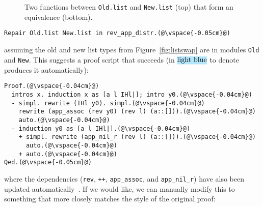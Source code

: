 \iffalse
\begin{figure*}
\begin{minipage}{0.46\textwidth}
   
\end{minipage}
\hfill
\begin{minipage}{0.46\textwidth}
   
\end{minipage}
\vspace{-0.4cm}
\caption{The updated \lstinline{list} (right) is the old \lstinline{list} (left) with its two constructors swapped (\codediff{orange}).}
\label{fig:listswap}
\end{figure*}
\fi

\begin{figure*}
\vspace{-0.3cm}
\caption{Two functions between \lstinline{Old.list} and \lstinline{New.list} (top) that form an equivalence (bottom).}
\label{fig:equivalence}
\end{figure*}

\begin{lstlisting}
Repair Old.list New.list in rev_app_distr.(@\vspace{-0.05cm}@)
\end{lstlisting}
assuming the old and new list types from Figure~\ref{fig:listswap} are in modules \lstinline{Old} and \lstinline{New}.
This suggests a proof script that succeeds (in $\codeauto{light blue}$ to denote \toolname produces it automatically):

\begin{lstlisting}[backgroundcolor=\color{cyan!30}]
Proof.(@\vspace{-0.04cm}@)
  intros x. induction x as [a l IHl|]; intro y0.(@\vspace{-0.04cm}@)
  - simpl. rewrite (IHl y0). simpl.(@\vspace{-0.04cm}@)
    rewrite (app_assoc (rev y0) (rev l) (a::[])).(@\vspace{-0.04cm}@)
    auto.(@\vspace{-0.04cm}@)
  - induction y0 as [a l IHl|].(@\vspace{-0.04cm}@)
    + simpl. rewrite (app_nil_r (rev l) (a::[])).(@\vspace{-0.04cm}@)
      auto.(@\vspace{-0.04cm}@)
    + auto.(@\vspace{-0.04cm}@)
Qed.(@\vspace{-0.05cm}@)
\end{lstlisting}
where the dependencies (\lstinline{rev}, \lstinline{++}, \lstinline{app_assoc}, and \lstinline{app_nil_r}) have
also been updated automatically~. %
If we would like, we can manually modify this to something that more closely matches the style of the original proof:

